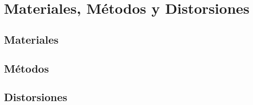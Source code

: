 \chapter{Materiales, Métodos y Distorsiones}
\section{Materiales}
\section{Métodos}
\section{Distorsiones}
